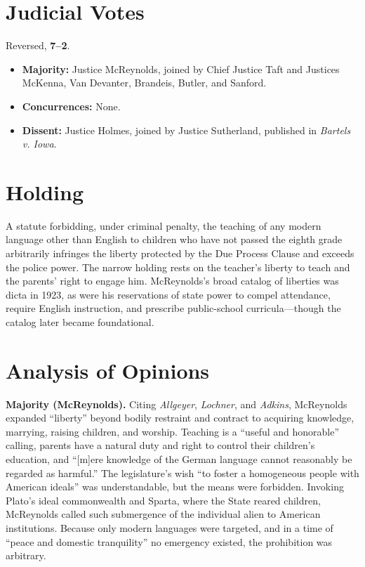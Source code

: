 \documentclass[12pt]{article}
\begin{document}
\section{Judicial Votes}

Reversed, \textbf{7--2}.
\begin{itemize}
\item \textbf{Majority:} Justice McReynolds, joined by Chief Justice Taft and Justices McKenna, Van Devanter, Brandeis, Butler, and Sanford.
\item \textbf{Concurrences:} None.
\item \textbf{Dissent:} Justice Holmes, joined by Justice Sutherland, published in \textit{Bartels v. Iowa}.
\end{itemize}

\section{Holding}

A statute forbidding, under criminal penalty, the teaching of any modern language other than English to children who have not passed the eighth grade arbitrarily infringes the liberty protected by the Due Process Clause and exceeds the police power. The narrow holding rests on the teacher's liberty to teach and the parents' right to engage him. McReynolds's broad catalog of liberties was dicta in 1923, as were his reservations of state power to compel attendance, require English instruction, and prescribe public-school curricula---though the catalog later became foundational.

\section{Analysis of Opinions}

\textbf{Majority (McReynolds).} Citing \textit{Allgeyer}, \textit{Lochner}, and \textit{Adkins}, McReynolds expanded ``liberty'' beyond bodily restraint and contract to acquiring knowledge, marrying, raising children, and worship. Teaching is a ``useful and honorable'' calling, parents have a natural duty and right to control their children's education, and ``[m]ere knowledge of the German language cannot reasonably be regarded as harmful.'' The legislature's wish ``to foster a homogeneous people with American ideals'' was understandable, but the means were forbidden. Invoking Plato's ideal commonwealth and Sparta, where the State reared children, McReynolds called such submergence of the individual alien to American institutions. Because only modern languages were targeted, and in a time of ``peace and domestic tranquility'' no emergency existed, the prohibition was arbitrary.
\end{document}
